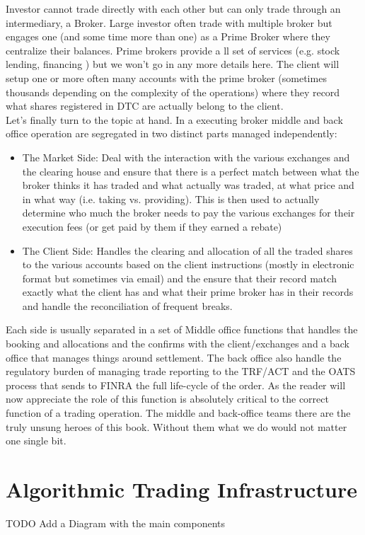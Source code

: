 Investor cannot trade directly with each other but can only trade through an intermediary, a Broker. Large investor often trade with multiple broker but engages one (and some time more than one) as a Prime Broker where they centralize their balances. Prime brokers provide a ll set of services (e.g. stock lending, financing ) but we won't go in any more details here. The client will setup one or more often many accounts with the prime broker (sometimes thousands depending on the complexity of the operations) where they record what shares registered in DTC are actually belong to the client. \\

Let's finally turn to the topic at hand. In a executing broker middle and back office operation are segregated in two distinct parts managed independently: 
\begin{itemize}
\item The Market Side: Deal with the interaction with the various exchanges  and the clearing house and ensure that there is a perfect match between what the broker thinks it has traded and what actually was traded, at what price and in what way (i.e. taking vs. providing). This is then used to actually determine who much the broker needs to pay the various exchanges for their execution fees (or get paid by them if they earned a rebate)
\item The Client Side: Handles the clearing and allocation of all the traded shares to the various accounts based on the client instructions (mostly in electronic format but sometimes via email) and the ensure that their record match exactly what the client has and what their prime broker has in their records and handle the reconciliation of frequent breaks.
\end{itemize}

Each side is usually separated in a set of Middle office functions that handles the booking and allocations and the confirms with the client/exchanges and a back office that manages things around settlement.
The back office also handle the regulatory burden of  managing trade reporting to the TRF/ACT and the OATS process that sends to FINRA the full life-cycle of the order. As the reader will now appreciate the role of this function is absolutely critical to the correct function of a trading operation. The middle and back-office teams there are the truly unsung heroes of this book. Without them what we do would not matter one single bit.

\section{Algorithmic Trading Infrastructure}
TODO Add a Diagram with the main components

